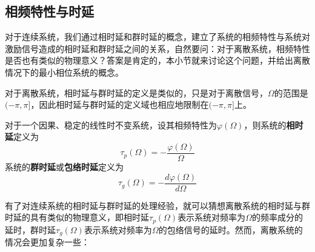 \subsection{相频特性与时延}\label{sub:phase_response}

对于连续系统，我们通过相时延和群时延的概念，建立了系统的相频特性与系统对激励信号造成的相时延和群时延之间的关系，自然要问：对于离散系统，相频特性是否也有类似的物理意义？答案是肯定的，本小节就来讨论这个问题，并给出离散情况下的最小相位系统的概念。

对于离散系统，相时延与群时延的定义是类似的，只是对于离散信号，$\Omega$的范围是$(-\pi,\pi]$，因此相时延与群时延的定义域也相应地限制在$(-\pi,\pi]$上。

\begin{definition}[相时延与群时延]
    对于一个因果、稳定的线性时不变系统，设其相频特性为$\varphi(\Omega)$，则系统的\textbf{相时延}定义为
    $$\tau_p(\Omega)=-\frac{\varphi(\Omega)}{\Omega}$$
    系统的\textbf{群时延}或\textbf{包络时延}定义为
    $$\tau_g(\Omega)=-\frac{d\varphi(\Omega)}{d\Omega}$$
\end{definition}

有了对连续系统的相时延与群时延的处理经验，就可以猜想离散系统的相时延与群时延的具有类似的物理意义，即相时延$\tau_p(\Omega)$表示系统对频率为$\Omega$的频率成分的延时，群时延$\tau_g(\Omega)$表示系统对频率为$\Omega$的包络信号的延时。然而，离散系统的情况会更加复杂一些：


